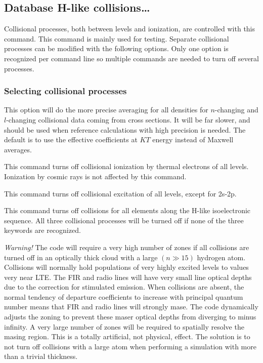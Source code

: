\subsection{Database H-like collisions\dots }
\label{sec:datahlike}

Collisional processes, both between levels and ionization, are controlled
with this command.   This command is mainly
used for testing.  Separate collisional processes can be modified with
the following options.  Only one option is recognized per command line so
multiple commands are needed to turn off several processes.  

\subsubsection{Selecting collisional processes}


 This option will do the more
precise averaging for all densities for $n$-changing and $l$-changing
collisional data coming from cross sections. It will
be far slower, and should be used when reference calculations with high
precision is needed.  The default is to use the effective coefficients at $KT$
energy instead of Maxwell averages. 

This command turns off collisional
ionization by thermal electrons of all levels.
Ionization by
cosmic rays is not affected by this command.

This command turns off collisional
excitation of all levels, except for 2s-2p.

This command turns off collisions for all elements along the H-like
isoelectronic sequence.
All three collisional processes will be turned
off if none of the three keywords are recognized.

\emph{Warning!}  The code will require a very high number of zones
if all collisions
are turned off in an optically thick cloud with a large
$(n \gg 15)$ hydrogen atom.
Collisions will normally hold populations of very highly excited
levels to values very near LTE.
The FIR and radio lines will have very
small line optical depths due to the correction for stimulated emission.
When collisions are absent, the normal tendency of departure coefficients
to increase with principal quantum number means that FIR and radio lines
will strongly mase.
The code dynamically adjusts the zoning to prevent
these maser optical depths from diverging to minus infinity.
A very large
number of zones will be required to spatially resolve the masing region.
This is a totally artificial, not physical, effect.
The solution is to
not turn off collisions with a large atom when performing a
simulation with more than a trivial thickness.

